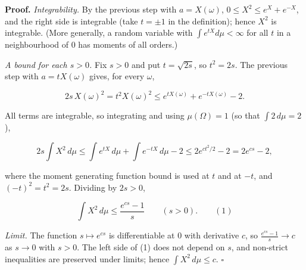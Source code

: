 \documentclass[11pt,a4paper]{article}
\begin{document}
\textbf{Proof.} \emph{Integrability.} By the previous step with \(a=X(\omega)\), \(0\le X^2\le e^{X}+e^{-X}\), and the right side is integrable (take \(t=\pm1\) in the definition); hence \(X^2\) is integrable. (More generally, a random variable with \(\int e^{tX}d\mu<\infty\) for all \(t\) in a neighbourhood of \(0\) has moments of all orders.)




\emph{A bound for each \(s>0\).} Fix \(s>0\) and put \(t=\sqrt{2s}\), so \(t^2=2s\). The previous step with \(a=tX(\omega)\) gives, for every \(\omega\),


\[2s\,X(\omega)^2=t^2X(\omega)^2\le e^{tX(\omega)}+e^{-tX(\omega)}-2.\]


All terms are integrable, so integrating and using \(\mu(\Omega)=1\) (so that \(\int2\,d\mu=2\)),


\[2s\int X^2\,d\mu\le\int e^{tX}\,d\mu+\int e^{-tX}\,d\mu-2\le2e^{ct^2/2}-2=2e^{cs}-2,\]


where the moment generating function bound is used at \(t\) and at \(-t\), and \((-t)^2=t^2=2s\). Dividing by \(2s>0\),


\[\int X^2\,d\mu\le\frac{e^{cs}-1}{s}\qquad(s>0).\qquad(1)\]


\emph{Limit.} The function \(s\mapsto e^{cs}\) is differentiable at \(0\) with derivative \(c\), so \(\frac{e^{cs}-1}{s}\to c\) as \(s\to0\) with \(s>0\). The left side of (1) does not depend on \(s\), and non-strict inequalities are preserved under limits; hence \(\int X^2\,d\mu\le c\). \(\square\)
\end{document}
